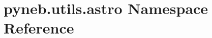 \hypertarget{namespacepyneb_1_1utils_1_1astro}{}\section{pyneb.\+utils.\+astro Namespace Reference}
\label{namespacepyneb_1_1utils_1_1astro}
